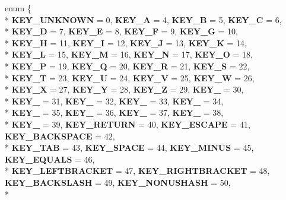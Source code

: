 \begin{DoxyCompactItemize}
\item 
\hypertarget{class_z_e_g_l_1_1_input_a63c4a9987b2fe681fcf8e17d5f88a838}{}enum \{ \\*
{\bfseries K\+E\+Y\+\_\+\+U\+N\+K\+N\+O\+W\+N} = 0, 
{\bfseries K\+E\+Y\+\_\+\+A} = 4, 
{\bfseries K\+E\+Y\+\_\+\+B} = 5, 
{\bfseries K\+E\+Y\+\_\+\+C} = 6, 
\\*
{\bfseries K\+E\+Y\+\_\+\+D} = 7, 
{\bfseries K\+E\+Y\+\_\+\+E} = 8, 
{\bfseries K\+E\+Y\+\_\+\+F} = 9, 
{\bfseries K\+E\+Y\+\_\+\+G} = 10, 
\\*
{\bfseries K\+E\+Y\+\_\+\+H} = 11, 
{\bfseries K\+E\+Y\+\_\+\+I} = 12, 
{\bfseries K\+E\+Y\+\_\+\+J} = 13, 
{\bfseries K\+E\+Y\+\_\+\+K} = 14, 
\\*
{\bfseries K\+E\+Y\+\_\+\+L} = 15, 
{\bfseries K\+E\+Y\+\_\+\+M} = 16, 
{\bfseries K\+E\+Y\+\_\+\+N} = 17, 
{\bfseries K\+E\+Y\+\_\+\+O} = 18, 
\\*
{\bfseries K\+E\+Y\+\_\+\+P} = 19, 
{\bfseries K\+E\+Y\+\_\+\+Q} = 20, 
{\bfseries K\+E\+Y\+\_\+\+R} = 21, 
{\bfseries K\+E\+Y\+\_\+\+S} = 22, 
\\*
{\bfseries K\+E\+Y\+\_\+\+T} = 23, 
{\bfseries K\+E\+Y\+\_\+\+U} = 24, 
{\bfseries K\+E\+Y\+\_\+\+V} = 25, 
{\bfseries K\+E\+Y\+\_\+\+W} = 26, 
\\*
{\bfseries K\+E\+Y\+\_\+\+X} = 27, 
{\bfseries K\+E\+Y\+\_\+\+Y} = 28, 
{\bfseries K\+E\+Y\+\_\+\+Z} = 29, 
{\bfseries K\+E\+Y\+\_} = 30, 
\\*
{\bfseries K\+E\+Y\+\_} = 31, 
{\bfseries K\+E\+Y\+\_} = 32, 
{\bfseries K\+E\+Y\+\_} = 33, 
{\bfseries K\+E\+Y\+\_} = 34, 
\\*
{\bfseries K\+E\+Y\+\_} = 35, 
{\bfseries K\+E\+Y\+\_} = 36, 
{\bfseries K\+E\+Y\+\_} = 37, 
{\bfseries K\+E\+Y\+\_} = 38, 
\\*
{\bfseries K\+E\+Y\+\_} = 39, 
{\bfseries K\+E\+Y\+\_\+\+R\+E\+T\+U\+R\+N} = 40, 
{\bfseries K\+E\+Y\+\_\+\+E\+S\+C\+A\+P\+E} = 41, 
{\bfseries K\+E\+Y\+\_\+\+B\+A\+C\+K\+S\+P\+A\+C\+E} = 42, 
\\*
{\bfseries K\+E\+Y\+\_\+\+T\+A\+B} = 43, 
{\bfseries K\+E\+Y\+\_\+\+S\+P\+A\+C\+E} = 44, 
{\bfseries K\+E\+Y\+\_\+\+M\+I\+N\+U\+S} = 45, 
{\bfseries K\+E\+Y\+\_\+\+E\+Q\+U\+A\+L\+S} = 46, 
\\*
{\bfseries K\+E\+Y\+\_\+\+L\+E\+F\+T\+B\+R\+A\+C\+K\+E\+T} = 47, 
{\bfseries K\+E\+Y\+\_\+\+R\+I\+G\+H\+T\+B\+R\+A\+C\+K\+E\+T} = 48, 
{\bfseries K\+E\+Y\+\_\+\+B\+A\+C\+K\+S\+L\+A\+S\+H} = 49, 
{\bfseries K\+E\+Y\+\_\+\+N\+O\+N\+U\+S\+H\+A\+S\+H} = 50, 
\\*

\end{DoxyCompactItemize}
